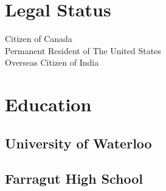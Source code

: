 \documentclass[letterpaper]{deedy-resume} %
\begin{document}
\begin{minipage}[t]{0.33\textwidth} %


\section{Legal Status} 

Citizen of Canada \\
Permanent Resident of The United States \\
Overseas Citizen of India

\sectionspace %


\section{Education} 

\subsection{University of Waterloo}


\sectionspace %






\subsection{Farragut High School}


\end{minipage}
\end{document}
